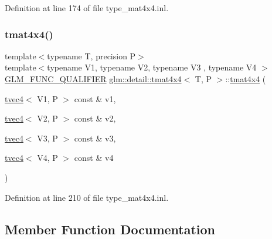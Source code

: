 Definition at line 174 of file type\+\_\+mat4x4.\+inl.

\mbox{\label{structglm_1_1detail_1_1tmat4x4_ad7a7e2dc47a7bd42e43ddf68efbab34f}} 
\subsubsection{\texorpdfstring{tmat4x4()}{tmat4x4()}\hspace{0.1cm}{\footnotesize\ttfamily [22/22]}}
{\footnotesize\ttfamily template$<$typename T, precision P$>$ \\
template$<$typename V1, typename V2, typename V3 , typename V4 $>$ \\
\hyperlink{setup_8hpp_a33fdea6f91c5f834105f7415e2a64407}{G\+L\+M\+\_\+\+F\+U\+N\+C\+\_\+\+Q\+U\+A\+L\+I\+F\+I\+ER} \hyperlink{structglm_1_1detail_1_1tmat4x4}{glm\+::detail\+::tmat4x4}$<$ T, P $>$\+::\hyperlink{structglm_1_1detail_1_1tmat4x4}{tmat4x4} (\begin{DoxyParamCaption}\item[{\hyperlink{structglm_1_1detail_1_1tvec4}{tvec4}$<$ V1, P $>$ const \&}]{v1,  }\item[{\hyperlink{structglm_1_1detail_1_1tvec4}{tvec4}$<$ V2, P $>$ const \&}]{v2,  }\item[{\hyperlink{structglm_1_1detail_1_1tvec4}{tvec4}$<$ V3, P $>$ const \&}]{v3,  }\item[{\hyperlink{structglm_1_1detail_1_1tvec4}{tvec4}$<$ V4, P $>$ const \&}]{v4 }\end{DoxyParamCaption})}



Definition at line 210 of file type\+\_\+mat4x4.\+inl.



\subsection{Member Function Documentation}
\mbox{\label{structglm_1_1detail_1_1tmat4x4_a3904d82ee46ff5c6c343c704cc4894f2}} 
